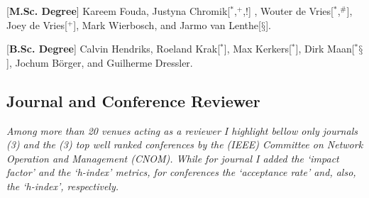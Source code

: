 \documentclass[print]{styles/friggeri-cv-mac} %
\begin{document}
\begin{entrylist}
\vspace{-0.3cm}
\entry
{[\textbf{M.Sc. Degree}]}
{\textnormal{Kareem Fouda, Justyna Chromik[$^*$,$^+$,$!$] , Wouter de Vries[$^*$,$^\#$], Joey de Vries[$^+$], Mark Wierbosch, and Jarmo van Lenthe[$§$].}}
{}

\vspace{-0.3cm}
\entry
{[\textbf{B.Sc. Degree}]}
{\textnormal{Calvin Hendriks, Roeland Krak[$^*$], Max Kerkers[$^*$], Dirk Maan[$^*§$], Jochum Börger, and Guilherme Dressler.}} 
{}

\end{entrylist}



\newpage
\subsection{Journal and Conference Reviewer}\vspace{-5pt}

\textit{Among more than 20 venues acting as a
reviewer I highlight bellow only journals (3) and the (3) top well ranked conferences by the
(IEEE) Committee on Network Operation and Management (CNOM). While for journal
I added the `impact factor' and the `h-index' metrics, for conferences the
`acceptance rate' and, also, the `h-index', respectively.}
\end{document}
